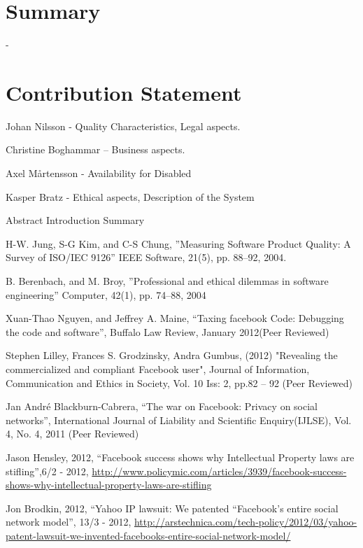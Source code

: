 \documentclass[conference]{IEEEtran}
\begin{document}
\section{Summary}
-
\section{Contribution Statement}
Johan Nilsson - Quality Characteristics, Legal aspects.

Christine Boghammar – Business aspects.

Axel Mårtensson - Availability for Disabled

Kasper Bratz - Ethical aspects, Description of the System

Abstract
Introduction
Summary
\begin{thebibliography}{1}

H-W. Jung, S-G Kim, and C-S Chung, ''Measuring Software Product Quality: A
Survey of ISO/IEC 9126'' IEEE Software, 21(5), pp. 88--92, 2004.

B. Berenbach, and M. Broy, ''Professional and ethical dilemmas in software
engineering'' Computer, 42(1), pp. 74--88, 2004

Xuan-Thao Nguyen, and Jeffrey A. Maine, “Taxing facebook Code: Debugging the
code and software”, Buffalo Law Review, January 2012(Peer Reviewed)

Stephen Lilley, Frances S. Grodzinsky, Andra Gumbus, (2012) "Revealing the
commercialized and compliant Facebook user", Journal of Information,
Communication and Ethics in Society, Vol. 10 Iss: 2, pp.82 – 92 (Peer Reviewed)

Jan André Blackburn-Cabrera, “The war on Facebook: Privacy on social networks”,
International Journal of Liability and Scientific Enquiry(IJLSE), Vol. 4, No.
4, 2011 (Peer Reviewed)

Jason Hensley, 2012, “Facebook success shows why Intellectual Property laws are
stifling”,6/2 - 2012,
\href{http://www.policymic.com/articles/3939/facebook-success-shows-why-intellectual-property-laws-are-stifling}{http://www.policymic.com/articles/3939/facebook-success-shows-why-intellectual-property-laws-are-stifling}

Jon Brodkin,  2012, “Yahoo IP lawsuit: We patented “Facebook’s entire social
network model”, 13/3 - 2012,
\href{http://arstechnica.com/tech-policy/2012/03/yahoo-patent-lawsuit-we-invented-facebooks-entire-social-network-model/}{http://arstechnica.com/tech-policy/2012/03/yahoo-patent-lawsuit-we-invented-facebooks-entire-social-network-model/}


\end{thebibliography}
\end{document}
